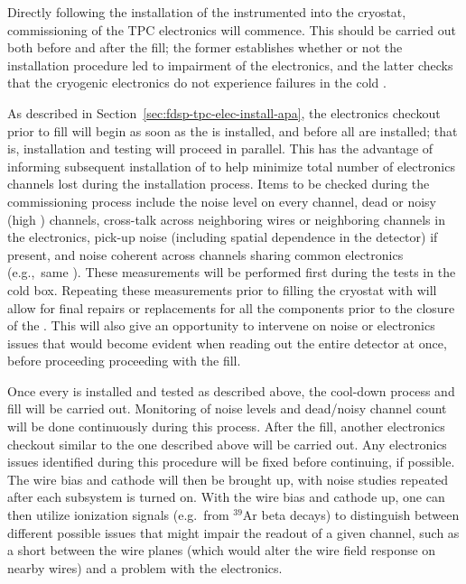 Directly following the installation of the instrumented  into the cryostat, commissioning of the
TPC electronics will commence.  This should be carried out both before and after the \lar fill;
the former establishes whether or not the installation procedure led to impairment of the
electronics, and the latter checks that the cryogenic electronics do not experience failures
in the cold \lar.

As described in Section~\ref{sec:fdsp-tpc-elec-install-apa}, the electronics checkout prior to
\lar fill will begin as soon as the  is installed, and before all  are installed; that is,
installation and testing will proceed in parallel.  This has the advantage of informing
subsequent installation of  to help minimize total number of electronics channels lost
during the installation process.  Items to be checked during the commissioning process include
the noise level on every channel, dead or noisy (high \rms) channels,
cross-talk across neighboring wires or neighboring channels in the electronics,
pick-up noise (including spatial dependence in the detector) if present, and
noise coherent across channels sharing common electronics (e.g.,~same ).
These measurements will be performed first during the tests in the cold box.  Repeating these
measurements prior to filling the cryostat with \lar will allow for final repairs or replacements
for all the  components prior to the closure of the . This will also give an opportunity
to intervene on noise or electronics issues that would become evident when reading out
the entire detector at once, before proceeding proceeding with the \lar fill.

Once every  is installed and tested as described above, the cool-down process and \lar fill
will be carried out.  Monitoring of noise levels and dead/noisy channel count will be
done continuously during this process.  After the \lar fill, another electronics checkout
similar to the one described above will be carried out.  Any electronics issues identified
during this procedure will be fixed before continuing, if possible.  The wire bias  and
cathode  will then be brought up, with noise studies repeated after each subsystem is
turned on.  With the wire bias  and cathode  up, one can then utilize ionization signals
(e.g.~from $\mathrm{{}^{39}Ar}$ beta decays) to distinguish between different possible issues
that might impair the readout of a given channel, such as a short between the wire planes
(which would alter the wire field response on nearby wires) and a problem with the electronics.

